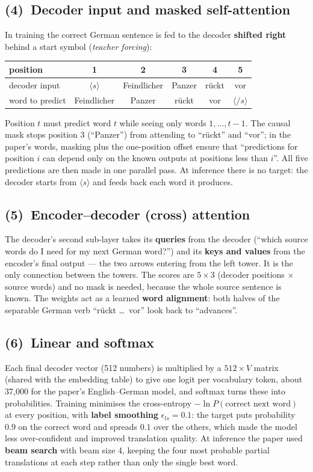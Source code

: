 \documentclass[11pt]{article}
\newcommand{\blk}[1]{\textbf{(#1)}}
\begin{document}
\subsection{\blk4\ Decoder input and masked self-attention}
In training the correct German sentence is fed to the decoder \textbf{shifted right} behind a start symbol (\emph{teacher forcing}):
\begin{center}\small\renewcommand{\arraystretch}{1.2}
\begin{tabular}{lccccc}\toprule
position & 1 & 2 & 3 & 4 & 5\\\midrule
decoder input & $\langle s\rangle$ & Feindlicher & Panzer & rückt & vor\\
word to predict & Feindlicher & Panzer & rückt & vor & $\langle/s\rangle$\\\bottomrule
\end{tabular}\end{center}
Position $t$ must predict word $t$ while seeing only words $1,\dots,t-1$. The causal mask stops position 3 (``Panzer'') from attending to ``rückt'' and ``vor''; in the paper's words, masking plus the one-position offset ensure that ``predictions for position $i$ can depend only on the known outputs at positions less than $i$''. All five predictions are then made in one parallel pass. At inference there is no target: the decoder starts from $\langle s\rangle$ and feeds back each word it produces.

\subsection{\blk5\ Encoder--decoder (cross) attention}
The decoder's second sub-layer takes its \textbf{queries} from the decoder (``which source words do I need for my next German word?'') and its \textbf{keys and values} from the encoder's final output --- the two arrows entering from the left tower. It is the only connection between the towers. The scores are $5\times3$ (decoder positions $\times$ source words) and no mask is needed, because the whole source sentence is known. The weights act as a learned \textbf{word alignment}: both halves of the separable German verb ``rückt \dots\ vor'' look back to ``advances''.

\subsection{\blk6\ Linear and softmax}
Each final decoder vector (512 numbers) is multiplied by a $512\times V$ matrix (shared with the embedding table) to give one logit per vocabulary token, about 37,000 for the paper's English--German model, and softmax turns these into probabilities. Training minimises the cross-entropy $-\ln P(\text{correct next word})$ at every position, with \textbf{label smoothing} $\epsilon_{ls}=0.1$: the target puts probability $0.9$ on the correct word and spreads $0.1$ over the others, which made the model less over-confident and improved translation quality. At inference the paper used \textbf{beam search} with beam size 4, keeping the four most probable partial translations at each step rather than only the single best word.
\end{document}
